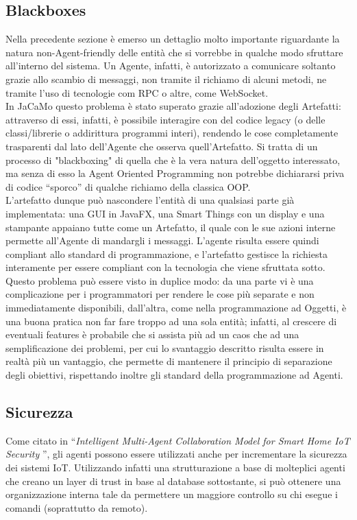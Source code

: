 \documentclass[12pt,a4paper,openright,oneside]{report}
\newcommand{\quotes}[1]{``#1''}
\begin{document}
\subsection{Blackboxes}
Nella precedente sezione è emerso un dettaglio molto importante riguardante la natura non-Agent-friendly delle entità che si vorrebbe in qualche modo sfruttare all'interno del sistema. Un Agente, infatti, è autorizzato a comunicare soltanto grazie allo scambio di messaggi, non tramite il richiamo di alcuni metodi, ne tramite l'uso di tecnologie com RPC o altre, come WebSocket.\\

In JaCaMo questo problema è stato superato grazie all'adozione degli Artefatti: attraverso di essi, infatti, è possibile interagire con del codice legacy (o delle classi/librerie o addirittura programmi interi), rendendo le cose completamente trasparenti dal lato dell'Agente che osserva quell'Artefatto. Si tratta di un processo di "blackboxing" di quella che è la vera natura dell'oggetto interessato, ma senza di esso la Agent Oriented Programming non potrebbe dichiararsi priva di codice \quotes{sporco} di qualche richiamo della classica OOP.\\

L'artefatto dunque può nascondere l'entità di una qualsiasi parte già implementata: una GUI in JavaFX, una Smart Things con un display e una stampante appaiano tutte come un Artefatto, il quale con le sue azioni interne permette all'Agente di mandargli i messaggi. L'agente risulta essere quindi compliant allo standard di programmazione, e l'artefatto gestisce la richiesta interamente per essere compliant con la tecnologia che viene sfruttata sotto.\\

Questo problema può essere visto in duplice modo: da una parte vi è una complicazione per i programmatori per rendere le cose più separate e non immediatamente disponibili, dall'altra, come nella programmazione ad Oggetti, è una buona pratica non far fare troppo ad una sola entità; infatti, al crescere di eventuali features è probabile che si assista più ad un caos che ad una semplificazione dei problemi, per cui lo svantaggio descritto risulta essere in realtà più un vantaggio, che permette di mantenere il principio di separazione degli obiettivi, rispettando inoltre gli standard della programmazione ad Agenti.

\subsection{Sicurezza}
Come citato in \quotes{\textit{Intelligent Multi-Agent Collaboration Model for Smart Home IoT Security} \cite{security}}, gli agenti possono essere utilizzati anche per incrementare la sicurezza dei sistemi IoT. Utilizzando infatti una strutturazione a base di molteplici agenti che creano un layer di trust in base al database sottostante, si può ottenere una organizzazione interna tale da permettere un maggiore controllo su chi esegue i comandi (soprattutto da remoto).\\
\end{document}
